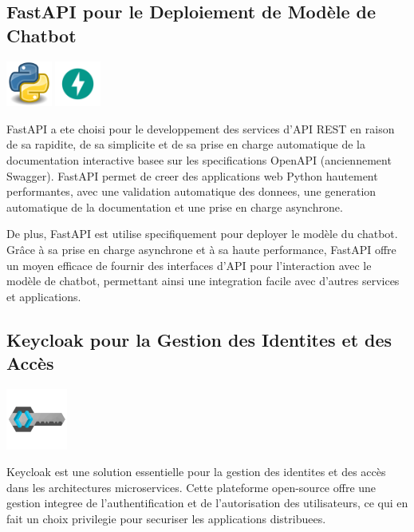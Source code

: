 \documentclass[a4paper, 11pt, openany]{report}
\begin{document}
\subsection{FastAPI pour le Deploiement de Modèle de Chatbot}
\begin{center}
\includegraphics[height=1.5cm]{assets/images/python.png}
\includegraphics[height=1.5cm]{assets/images/fastapi.png}
\end{center}

FastAPI a ete choisi pour le developpement des services d'API REST en raison de sa rapidite, de sa simplicite et de sa prise en charge automatique de la documentation interactive basee sur les specifications OpenAPI (anciennement Swagger). FastAPI permet de creer des applications web Python hautement performantes, avec une validation automatique des donnees, une generation automatique de la documentation et une prise en charge asynchrone.


De plus, FastAPI est utilise specifiquement pour deployer le modèle du chatbot. Grâce à sa prise en charge asynchrone et à sa haute performance, FastAPI offre un moyen efficace de fournir des interfaces d'API pour l'interaction avec le modèle de chatbot, permettant ainsi une integration facile avec d'autres services et applications.






\subsection{Keycloak pour la Gestion des Identites et des Accès}
\begin{center}
\includegraphics[height=2cm]{assets/images/keycloak.png}
\end{center}

Keycloak est une solution essentielle pour la gestion des identites et des accès dans les architectures microservices. Cette plateforme open-source offre une gestion integree de l'authentification et de l'autorisation des utilisateurs, ce qui en fait un choix privilegie pour securiser les applications distribuees.
\end{document}
